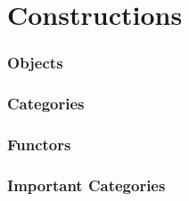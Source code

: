 \part{Constructions}

\section{Objects}









\section{Categories}







\section{Functors}







\section{Important Categories}




